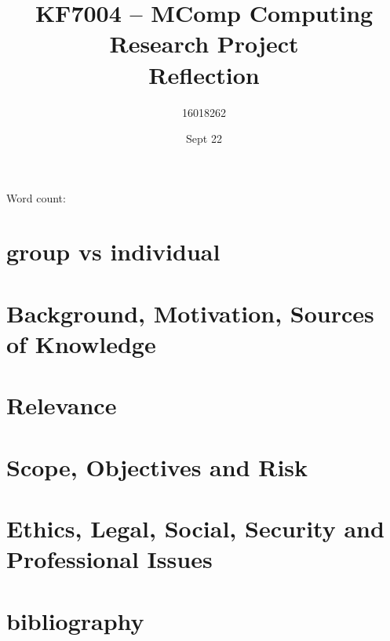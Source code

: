 \documentclass[10pt]{article}
\title{KF7004 – MComp Computing Research Project \\ Reflection}
\author{16018262}
\date{Sept 22}
\begin{document}
\maketitle
\begin{center}
	Word count: 
\end{center}
\tableofcontents
\section{group vs individual}

\section{Background, Motivation, Sources of Knowledge}

\section{Relevance}

\section{Scope, Objectives and Risk}

\section{Ethics, Legal, Social, Security and Professional Issues}

\section{bibliography}
\printbibliography
\appendix
\end{document}

